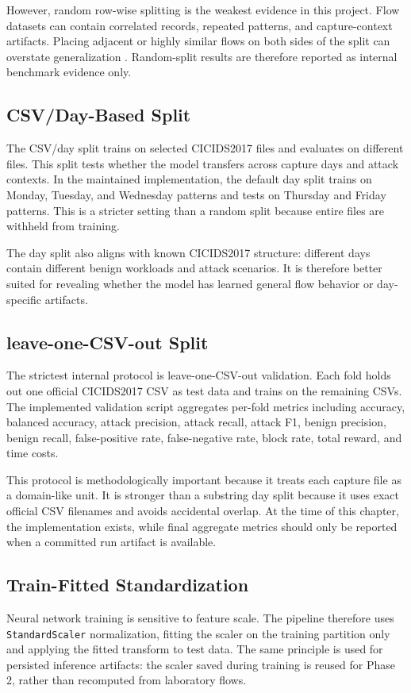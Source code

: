 However, random row-wise splitting is the weakest evidence in this project. Flow datasets can contain correlated records, repeated patterns, and capture-context artifacts. Placing adjacent or highly similar flows on both sides of the split can overstate generalization \parencite{Lanvin2023Errors,Arp2020DosDontsMLSecurity}. Random-split results are therefore reported as internal benchmark evidence only.

\subsection{CSV/Day-Based Split}
The CSV/day split trains on selected CICIDS2017 files and evaluates on different files. This split tests whether the model transfers across capture days and attack contexts. In the maintained implementation, the default day split trains on Monday, Tuesday, and Wednesday patterns and tests on Thursday and Friday patterns. This is a stricter setting than a random split because entire files are withheld from training.

The day split also aligns with known CICIDS2017 structure: different days contain different benign workloads and attack scenarios. It is therefore better suited for revealing whether the model has learned general flow behavior or day-specific artifacts.

\subsection{leave-one-CSV-out Split}
The strictest internal protocol is leave-one-CSV-out validation. Each fold holds out one official CICIDS2017 CSV as test data and trains on the remaining CSVs. The implemented validation script aggregates per-fold metrics including accuracy, balanced accuracy, attack precision, attack recall, attack F1, benign precision, benign recall, false-positive rate, false-negative rate, block rate, total reward, and time costs.

This protocol is methodologically important because it treats each capture file as a domain-like unit. It is stronger than a substring day split because it uses exact official CSV filenames and avoids accidental overlap. At the time of this chapter, the implementation exists, while final aggregate metrics should only be reported when a committed run artifact is available.

\subsection{Train-Fitted Standardization}
Neural network training is sensitive to feature scale. The pipeline therefore uses \texttt{StandardScaler} normalization, fitting the scaler on the training partition only and applying the fitted transform to test data. The same principle is used for persisted inference artifacts: the scaler saved during training is reused for Phase 2, rather than recomputed from laboratory flows.

